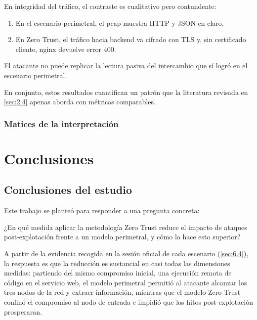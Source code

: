 \documentclass[11pt,spanish,listoffigures,listoftables]{tfgetsinf}
\begin{document}
        En integridad del tráfico, el contraste es cualitativo pero contundente:
        \begin{enumerate}
            \item En el escenario perimetral, el pcap muestra HTTP y JSON en claro.
            \item En Zero Trust, el tráfico hacia backend va cifrado con TLS y, sin certificado cliente, nginx devuelve error 400.
        \end{enumerate}
        
        El atacante no puede replicar la lectura pasiva del intercambio que sí logró en el escenario perimetral.
        
        En conjunto, estos resultados cuantifican un patrón que la literatura revisada en \cref{sec:2.4} apenas aborda con métricas comparables.

        \subsection{Matices de la interpretación}
        \label{sec:6.4.3}


\chapter{Conclusiones}

        \section{Conclusiones del estudio}
        Este trabajo se planteó para responder a una pregunta concreta:

        \begin{tcolorbox}[
            enhanced,
            frame hidden,
            borderline west={3pt}{0pt}{gray!70!black},
            sharp corners
        ]
            ¿En qué medida aplicar la metodología Zero Trust reduce el impacto de ataques post-explotación frente a un modelo perimetral, y cómo lo hace esto superior?
        \end{tcolorbox}

        A partir de la evidencia recogida en la sesión oficial de cada escenario (\cref{sec:6.4}), la respuesta es que la reducción es sustancial en casi todas las dimensiones medidas: partiendo del mismo compromiso inicial, una ejecución remota de código en el servicio web, el modelo perimetral permitió al atacante alcanzar los tres nodos de la red y extraer información, mientras que el modelo Zero Trust confinó el compromiso al nodo de entrada e impidió que los hitos post-explotación prosperaran.
\end{document}
